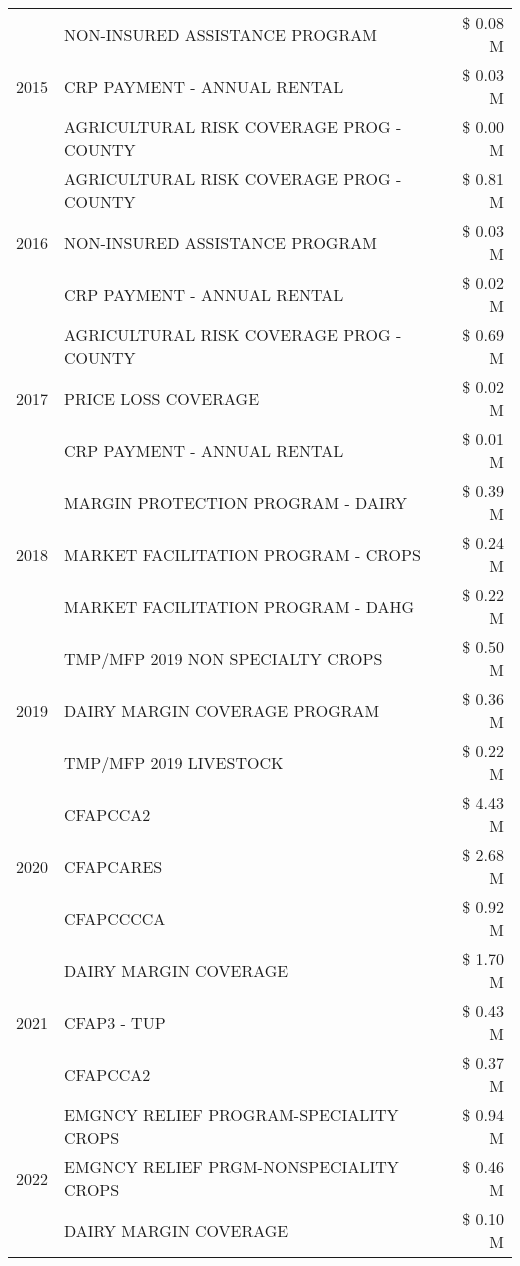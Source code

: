\begin{tabular}{llr}
\multirow[t]{3}{*}{2015} & NON-INSURED ASSISTANCE PROGRAM & \$ 0.08 M \\
 & CRP PAYMENT - ANNUAL RENTAL & \$ 0.03 M \\
 & AGRICULTURAL RISK COVERAGE PROG - COUNTY & \$ 0.00 M \\
\cline{1-3}
\multirow[t]{3}{*}{2016} & AGRICULTURAL RISK COVERAGE PROG - COUNTY & \$ 0.81 M \\
 & NON-INSURED ASSISTANCE PROGRAM & \$ 0.03 M \\
 & CRP PAYMENT - ANNUAL RENTAL & \$ 0.02 M \\
\cline{1-3}
\multirow[t]{3}{*}{2017} & AGRICULTURAL RISK COVERAGE PROG - COUNTY & \$ 0.69 M \\
 & PRICE LOSS COVERAGE & \$ 0.02 M \\
 & CRP PAYMENT - ANNUAL RENTAL & \$ 0.01 M \\
\cline{1-3}
\multirow[t]{3}{*}{2018} & MARGIN PROTECTION PROGRAM - DAIRY & \$ 0.39 M \\
 & MARKET FACILITATION PROGRAM - CROPS & \$ 0.24 M \\
 & MARKET FACILITATION PROGRAM - DAHG & \$ 0.22 M \\
\cline{1-3}
\multirow[t]{3}{*}{2019} & TMP/MFP 2019 NON SPECIALTY CROPS & \$ 0.50 M \\
 & DAIRY MARGIN COVERAGE PROGRAM & \$ 0.36 M \\
 & TMP/MFP 2019 LIVESTOCK & \$ 0.22 M \\
\cline{1-3}
\multirow[t]{3}{*}{2020} & CFAPCCA2 & \$ 4.43 M \\
 & CFAPCARES & \$ 2.68 M \\
 & CFAPCCCCA & \$ 0.92 M \\
\cline{1-3}
\multirow[t]{3}{*}{2021} & DAIRY MARGIN COVERAGE & \$ 1.70 M \\
 & CFAP3 - TUP & \$ 0.43 M \\
 & CFAPCCA2 & \$ 0.37 M \\
\cline{1-3}
\multirow[t]{3}{*}{2022} & EMGNCY RELIEF PROGRAM-SPECIALITY CROPS & \$ 0.94 M \\
 & EMGNCY RELIEF PRGM-NONSPECIALITY CROPS & \$ 0.46 M \\
 & DAIRY MARGIN COVERAGE & \$ 0.10 M \\
\cline{1-3}
\bottomrule
\end{tabular}
